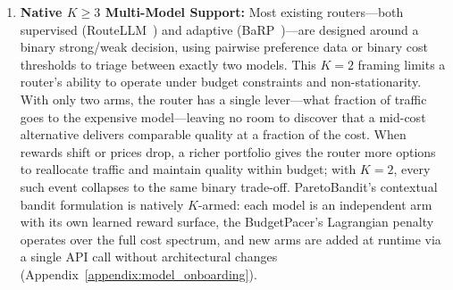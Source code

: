 \begin{enumerate}[leftmargin=*,nosep]
    \item \textbf{Native $K{\geq}3$ Multi-Model Support:} Most existing routers---both supervised (RouteLLM~\cite{ong2024routellm}) and adaptive (BaRP~\cite{wang2025barp})---are designed around a binary strong/weak decision, using pairwise preference data or binary cost thresholds to triage between exactly two models.  This $K{=}2$ framing limits a router's ability to operate under budget constraints and non-stationarity.  With only two arms, the router has a single lever---what fraction of traffic goes to the expensive model---leaving no room to discover that a mid-cost alternative delivers comparable quality at a fraction of the cost.  When rewards shift or prices drop, a richer portfolio gives the router more options to reallocate traffic and maintain quality within budget; with $K{=}2$, every such event collapses to the same binary trade-off.  ParetoBandit's contextual bandit formulation is natively $K$-armed: each model is an independent arm with its own learned reward surface, the BudgetPacer's Lagrangian penalty operates over the full cost spectrum, and new arms are added at runtime via a single API call without architectural changes (Appendix~\ref{appendix:model_onboarding}).
\end{enumerate}